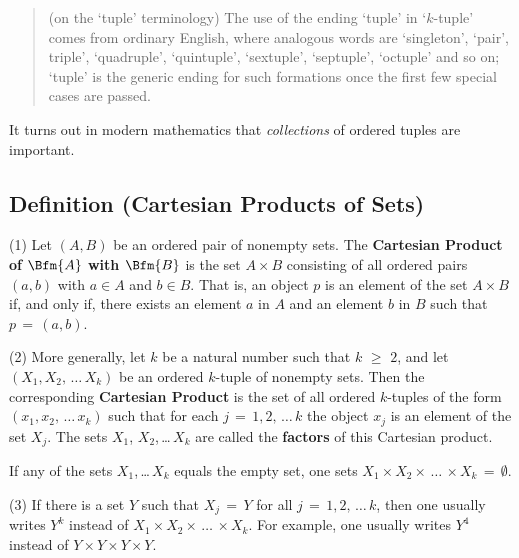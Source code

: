 \VV

\begin{quotation}
{\footnotesize \underline{\Note} (on the `tuple' terminology)
The use of the ending `tuple' in `$k$-tuple' comes from ordinary English, where analogous words are `singleton', `pair', triple', `quadruple', `quintuple', `sextuple', `septuple', `octuple' and so on;
    `tuple' is the generic ending for such formations once the first few special cases are passed.
}%
\end{quotation}

        It turns out in modern mathematics that {\em collections} of ordered tuples are important.

\V

            \subsection{\small{\bf Definition} (Cartesian Products of Sets)}
            \label{DefA12.30}

  \hspace*{\parindent} (1) Let $(A,B)$ be an ordered pair of nonempty sets.
    The {\bf Cartesian Product of $\Bfm{A}$ with $\Bfm{B}$}
    is the set $A{\times}B$ consisting of all ordered pairs $(a,b)$ with $a{\in}A$ and $b{\in}B$.
    That is, an object $p$ is an element of the set $A{\times}B$ if, and only if,
    there exists an element $a$ in $A$ and an element $b$ in $B$ such that $p\,=\,(a,b)$.

        (2) More generally, let $k$ be a natural number such that $k\,\,{\geq}\,\,2$,
    and let $(X_{1}, X_{2},\,{\ldots}\,X_{k})$ be an ordered $k$-tuple of nonempty sets.
    Then the corresponding {\bf Cartesian Product }
    is the set of all ordered $k$-tuples of the form $(x_{1}, x_{2},\,{\ldots}\,x_{k})$
    such that for each $j \,=\, 1,2,\,{\ldots}\,k$ the object $x_{j}$ is an element of the set $X_{j}$.
    The sets $X_{1}$, $X_{2}$,\,{\ldots}\,$X_{k}$ are called the {\bf factors} of this Cartesian product.

        If any of the sets $X_{1}$,\,{\ldots}\,$X_{k}$ equals the empty set, one sets $X_{1}{\times}X_{2}{\times}\,{\ldots}\,{\times}X_{k} \,=\, {\emptyset}$.

        (3) If there is a set $Y$ such that $X_{j} \,=\, Y$ for all $j \,=\, 1,2,\,{\ldots}\,k$,
    then one usually writes $Y^{k}$ instead of $X_{1}{\times}X_{2}{\times}\,{\ldots}\,{\times}X_{k}$.
    For example, one usually writes $Y^{4}$ instead of $Y{\times}Y{\times}Y{\times}Y$.


